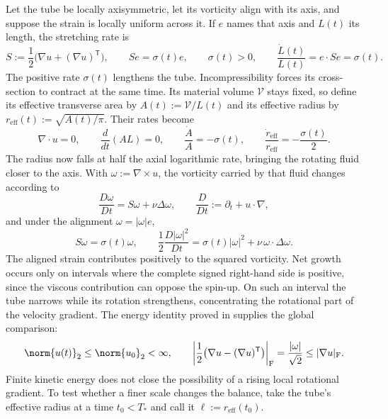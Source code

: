 Let the tube be locally axisymmetric, let its vorticity align with its axis, and suppose the strain is locally uniform across it. If \(e\) names that axis and \(L(t)\) its length, the stretching rate is
\[
  S:=\frac12\bigl(\nabla u+(\nabla u)^{\mathsf T}\bigr),
  \qquad
  Se=\sigma(t)e,
  \qquad
  \sigma(t)>0,
  \qquad
  \frac{\dot L(t)}{L(t)}
  =
  e\cdot Se
  =
  \sigma(t).
\]
The positive rate \(\sigma(t)\) lengthens the tube. Incompressibility forces its cross-section to contract at the same time. Its material volume \(\mathcal V\) stays fixed, so define its effective transverse area by \(A(t):=\mathcal V/L(t)\) and its effective radius by \(r_{\mathrm{eff}}(t):=\sqrt{A(t)/\pi}\). Their rates become
\[
  \nabla\cdot u=0,
  \qquad
  \frac{d}{dt}(A L)=0,
  \qquad
  \frac{\dot A}{A}=-\sigma(t),
  \qquad
  \frac{\dot r_{\mathrm{eff}}}{r_{\mathrm{eff}}}
  =
  -\frac{\sigma(t)}{2}.
\]
The radius now falls at half the axial logarithmic rate, bringing the rotating fluid closer to the axis. With \(\omega:=\nabla\times u\), the vorticity carried by that fluid changes according to
\[
  \frac{D\omega}{Dt}
  =
  S\omega+\nu\Delta\omega,
  \qquad
  \frac{D}{Dt}
  :=
  \partial_t+u\cdot\nabla,
\]
and under the alignment \(\omega=|\omega|e\),
\[
  S\omega
  =
  \sigma(t)\omega,
  \qquad
  \frac12\frac{D|\omega|^2}{Dt}
  =
  \sigma(t)|\omega|^2
  +
  \nu\,\omega\cdot\Delta\omega.
\]
The aligned strain contributes positively to the squared vorticity. Net growth occurs only on intervals where the complete signed right-hand side is positive, since the viscous contribution can oppose the spin-up. On such an interval the tube narrows while its rotation strengthens, concentrating the rotational part of the velocity gradient. The energy identity proved in  supplies the global comparison:
\[
  \norm{u(t)}_2
  \leq
  \norm{u_0}_2
  <\infty,
  \qquad
  \left|\frac12\bigl(\nabla u-(\nabla u)^{\mathsf T}\bigr)\right|_{\mathrm F}
  =
  \frac{|\omega|}{\sqrt2}
  \leq
  |\nabla u|_{\mathrm F}.
\]
Finite kinetic energy does not close the possibility of a rising local rotational gradient. To test whether a finer scale changes the balance, take the tube's effective radius at a time \(t_0<T_*\) and call it \(\ell:=r_{\mathrm{eff}}(t_0)\).


